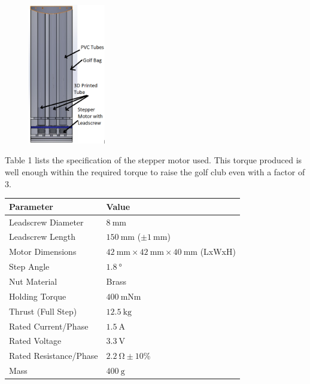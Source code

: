 \documentclass[11pt,landscape]{article}
\begin{document}
\begin{multicols}{3}
\begin{figure}[H]
    \begin{center}
        \includegraphics[width=0.3\textwidth]{Mech in bag.png}
        \label{fig:stepper_in_bag}
    \end{center}
\end{figure}

Table 1 lists the specification of the stepper motor used. This torque produced
is well enough within the required torque to raise the golf club even with a
factor of 3.

\begin{table}[H]
    \begin{center}
        \begin{tabular}{|l|l|}
            \hline
            \textbf{Parameter}     & \textbf{Value}          \\ \hline 
            Leadscrew Diameter     & $\SI{8}{\mm}$                  \\ \hline
            Leadscrew Length       & $\SI{150}{\mm}$ ($\pm\SI{1}{\mm}$)        \\ \hline
            Motor Dimensions       & $\SI{42}{\mm}\times\SI{42}{\mm}\times\SI{40}{\mm}$ (LxWxH) \\ \hline
            Step Angle             & $\SI{1.8}{\degree}$           \\ \hline
            Nut Material           & Brass                   \\ \hline
            Holding Torque         & $\SI{400}{\mN\m}$                \\ \hline
            Thrust (Full Step)     & $\SI{12.5}{\kg}$              \\ \hline
            Rated Current/Phase    & $\SI{1.5}{\ampere}$      \\ \hline
            Rated Voltage          & $\SI{3.3}{\volt}$     \\ \hline
            Rated Resistance/Phase &$\SI{2.2}{\ohm}\pm10$\%  \\ \hline
            Mass                   & $\SI{400}{\gram}$                  \\ \hline
        \end{tabular}
    \end{center}
\end{table}


\end{multicols}
\end{document}
